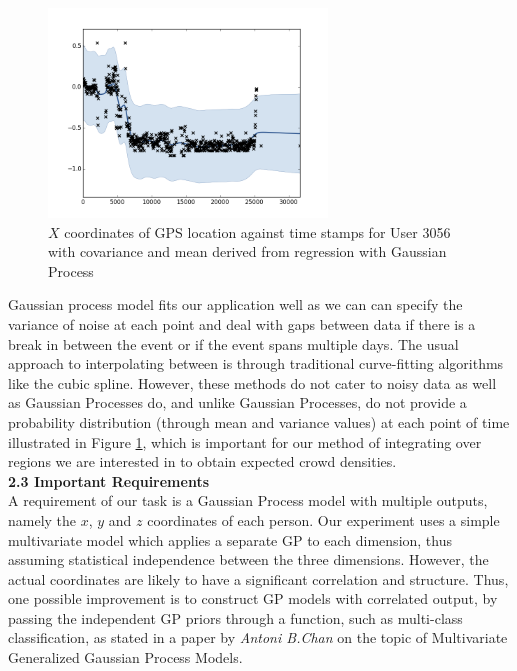 \documentclass[letterpaper]{article}
\begin{document}
\begin{figure}[h!]
  \centering
    \includegraphics[width=280px,natwidth=634,natheight=442]{selected_GP/3056.csv_X.png}
  \caption{$X$ coordinates of GPS location against time stamps for User 3056 with covariance and mean derived from regression with Gaussian Process}
  \label{fig:GP1}
\end{figure}

Gaussian process model fits our application well as we can can specify the variance of noise at each point and deal with gaps between data if there is a break in between the event or if the event spans multiple days. The usual approach to interpolating between is through traditional curve-fitting algorithms like the cubic spline. However, these methods do not cater to noisy data as well as Gaussian Processes do, and unlike Gaussian Processes, do not provide a probability distribution (through mean and variance values) at each point of time illustrated in Figure \ref{fig:GP1}, which is important for our method of integrating over regions we are interested in to obtain expected crowd densities.\\


{\bf2.3  Important Requirements} \\

A requirement of our task is a Gaussian Process model with multiple outputs, namely the $x$, $y$ and $z$ coordinates of each person. Our experiment uses a simple multivariate model which applies a separate GP to each dimension, thus assuming statistical independence between the three dimensions. However, the actual coordinates are likely to have a significant correlation and structure. Thus, one possible improvement is to construct GP models with correlated output, by passing the independent GP priors through a function, such as multi-class classification, as stated in a paper by {\it Antoni B.Chan} on the topic of Multivariate Generalized Gaussian Process Models. \\
\end{document}

